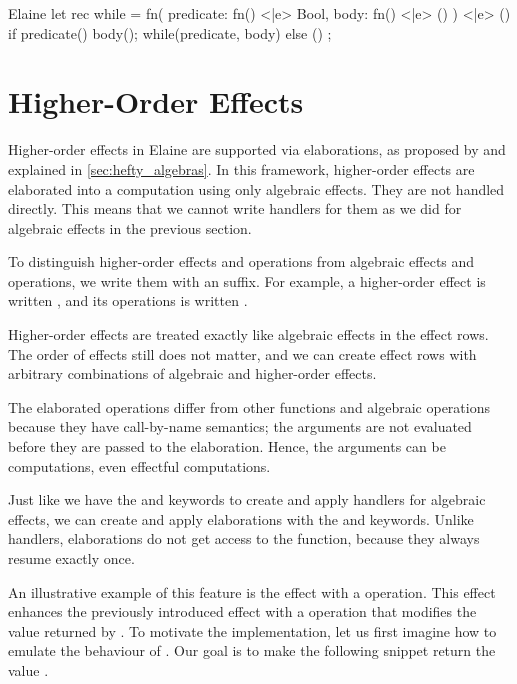 \begin{lst}{Elaine}
let rec while = fn(
    predicate: fn() <|e> Bool,
    body: fn() <|e> ()
) <|e> () {
    if predicate() {
        body();
        while(predicate, body)
    } else {
        ()
    }
};
\end{lst}
%
\section{Higher-Order Effects}\label{sec:hoeffects}

Higher-order effects in Elaine are supported via elaborations, as proposed by \textcite{bach_poulsen_hefty_2023} and explained in \cref{sec:hefty_algebras}. In this framework, higher-order effects are elaborated into a computation using only algebraic effects. They are not handled directly. This means that we cannot write handlers for them as we did for algebraic effects in the previous section.

To distinguish higher-order effects and operations from algebraic effects and operations, we write them with an \el{!} suffix. For example, a higher-order  effect is written , and its  operations is written .

Higher-order effects are treated exactly like algebraic effects in the effect rows. The order of effects still does not matter, and we can create effect rows with arbitrary combinations of algebraic and higher-order effects.

The elaborated operations differ from other functions and algebraic operations because they have call-by-name semantics; the arguments are not evaluated before they are passed to the elaboration. Hence, the arguments can be computations, even effectful computations.

Just like we have the  and  keywords to create and apply handlers for algebraic effects, we can create and apply elaborations with the  and  keywords. Unlike handlers, elaborations do not get access to the  function, because they always resume exactly once.

An illustrative example of this feature is the  effect with a  operation. This effect enhances the previously introduced  effect with a  operation that modifies the value returned by . To motivate the implementation, let us first imagine how to emulate the behaviour of . Our goal is to make the following snippet return the value .

